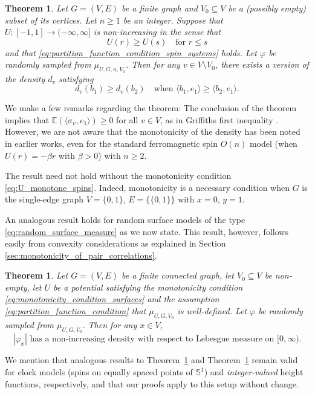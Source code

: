 \documentclass[english]{article}
\newtheorem{theorem}[counter]{Theorem}
\theoremstyle{plain}
\theoremstyle{plain}
\begin{document}
\begin{theorem}\label{thm:monotonicity_of_spin_O_n_density}
  Let $G = (V,E)$ be a finite graph and $V_0\subseteq V$ be a (possibly empty) subset of its vertices. Let $n\ge 1$ be an integer. Suppose that
  $U:[-1,1]\to(-\infty,\infty]$ is non-increasing in the sense that
  \begin{equation}\label{eq:U_monotone_spins}
    U(r)\ge U(s)\quad\text{for $r\le s$}
  \end{equation}
  and that \eqref{eq:partition_function_condition_spin_systems} holds. Let $\varphi$ be randomly sampled from $\mu_{U, G, n, V_0}$. Then for any
  $v\in V\setminus V_0$, there exists a version of the density $d_v$ satisfying
  \begin{equation}\label{eq:monotonicity_of_density}
    d_v(b_1) \ge d_v(b_2)\quad\text{when $\langle b_1, e_1\rangle\ge \langle b_2, e_1\rangle$}.
  \end{equation}
\end{theorem}
We make a few remarks regarding the theorem: The conclusion of the
theorem implies that $\mathbb{E}(\langle \sigma_v,
e_1\rangle)\ge 0$ for all $v\in V$, as in Griffiths first inequality \cite{Gri67, Gin70}. However, we are not aware that the monotonicity of the density has been noted in
earlier works, even for the standard ferromagnetic spin $O(n)$ model
(when $U(r) = -\beta r$ with $\beta>0$) with $n\ge 2$.

The result need not hold without the monotonicity condition
\eqref{eq:U_monotone_spins}. Indeed, monotonicity is a necessary
condition when $G$ is the single-edge graph $V = \{0,1\}$, $E =
\{\{0,1\}\}$ with $x=0$, $y=1$.

An analogous result holds for random surface models of the type
\eqref{eq:random_surface_measure} as we now state. This result,
however, follows easily from convexity considerations as explained
in Section \ref{sec:monotonicity_of_pair_correlations}.
\begin{theorem}\label{thm:non-increasing_density}
  Let $G=(V,E)$ be a finite connected graph, let $V_0\subseteq V$ be
non-empty, let $U$ be a potential satisfying the monotonicity
condition \eqref{eq:monotonicity_condition_surfaces} and the
assumption \eqref{eq:partition_function_condition} that
$\mu_{U,G,V_0}$ is well-defined. Let $\varphi$ be randomly sampled
from $\mu_{U,G,V_{0}}$. Then for any $x\in V$,
  \begin{equation*}
    |\varphi_x|\text{ has a non-increasing
    density with respect to Lebesgue measure on $[0,\infty)$}.
  \end{equation*}
\end{theorem}
We mention that analogous results to Theorem~\ref{thm:monotonicity_of_spin_O_n_density} and Theorem~\ref{thm:non-increasing_density} remain valid for clock models (spins on equally spaced points of $\mathbb{S}^1$) and \emph{integer-valued} height functions, respectively, and that our proofs apply to this setup without change.
\end{document}
